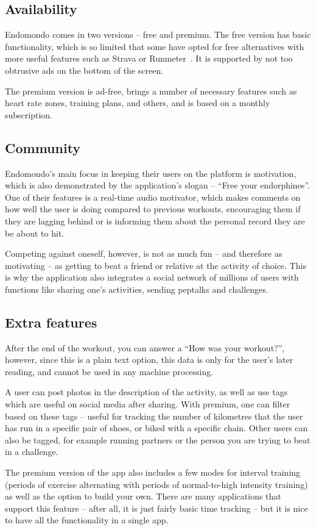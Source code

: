 \subsection*{Availability}
Endomondo comes in two versions -- free and premium.
The free version has basic functionality, which is so limited that some have opted for free alternatives with more useful features such as Strava or Runmeter~\cite{endomondo-review}.
It is supported by not too obtrusive ads on the bottom of the screen.

The premium version is ad-free, brings a number of necessary features such as heart rate zones, training plans, and others, and is based on a monthly subscription.
\subsection*{Community}
Endomondo's main focus in keeping their users on the platform is motivation, which is also demonstrated by the application's slogan -- ``Free your endorphines''.
One of their features is a real-time audio motivator, which makes comments on how well the user is doing compared to previous workouts,
encouraging them if they are lagging behind or is informing them about the personal record they are be about to hit.

Competing against oneself, however, is not as much fun -- and therefore as motivating -- as getting to beat a friend or relative at the activity of choice.
This is why the application also integrates a social network of millions of users with functions like sharing one's activities, sending peptalks and challenges.
\subsection*{Extra features}
After the end of the workout, you can answer a ``How was your workout?'', however, since this is a plain text option, this data is only for the user's later reading, and cannot be used in any machine processing.

A user can post photos in the description of the activity, as well as use tags which are useful on social media after sharing.
With premium, one can filter based on these tags -- useful for tracking the number of kilometres that the user has run in a specific pair of shoes, or biked with a specific chain.
Other users can also be tagged, for example running partners or the person you are trying to beat in a challenge.

The premium version of the app also includes a few modes for interval training (periods of exercise alternating with periods of normal-to-high intensity training) as well as the option to build your own.
There are many applications that support this feature -- after all, it is just fairly basic time tracking -- but it is nice to have all the functionality in a single app.
